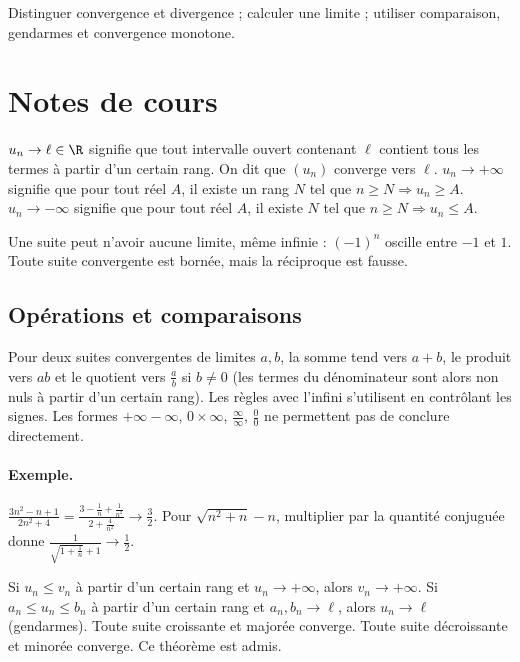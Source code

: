 \label{ch:2}


\begin{keypoint}[Objectifs]Distinguer convergence et divergence ; calculer une limite ; utiliser comparaison, gendarmes et convergence monotone.\end{keypoint}

\section{Notes de cours}
\begin{keypoint}[Définitions]
$u_n\to\ell\in\R$ signifie que tout intervalle ouvert contenant $\ell$ contient tous les termes à partir d'un certain rang. On dit que $(u_n)$ converge vers $\ell$.
$u_n\to+\infty$ signifie que pour tout réel $A$, il existe un rang $N$ tel que $n\ge N\Rightarrow u_n\ge A$. $u_n\to-\infty$ signifie que pour tout réel $A$, il existe $N$ tel que $n\ge N\Rightarrow u_n\le A$.
\end{keypoint}
Une suite peut n'avoir aucune limite, même infinie : $(-1)^n$ oscille entre $-1$ et $1$. Toute suite convergente est bornée, mais la réciproque est fausse.
\subsection{Opérations et comparaisons}
Pour deux suites convergentes de limites $a,b$, la somme tend vers $a+b$, le produit vers $ab$ et le quotient vers $\frac{a}{b}$ si $b\ne0$ (les termes du dénominateur sont alors non nuls à partir d'un certain rang). Les règles avec l'infini s'utilisent en contrôlant les signes. Les formes $+\infty-\infty$, $0\times\infty$, $\frac{\infty}{\infty}$, $\frac{0}{0}$ ne permettent pas de conclure directement.
\paragraph{Exemple.} $\frac{3n^2-n+1}{2n^2+4}=\frac{3-\frac{1}{n}+\frac{1}{n^2}}{2+\frac{4}{n^2}}\to\frac{3}{2}$. Pour $\sqrt{n^2+n}-n$, multiplier par la quantité conjuguée donne $\frac{1}{\sqrt{1+\frac{1}{n}}+1}\to\frac{1}{2}$.
\begin{keypoint}[Théorèmes]
Si $u_n\le v_n$ à partir d'un certain rang et $u_n\to+\infty$, alors $v_n\to+\infty$. Si $a_n\le u_n\le b_n$ à partir d'un certain rang et $a_n,b_n\to\ell$, alors $u_n\to\ell$ (gendarmes).
Toute suite croissante et majorée converge. Toute suite décroissante et minorée converge. Ce théorème est admis.
\end{keypoint}
